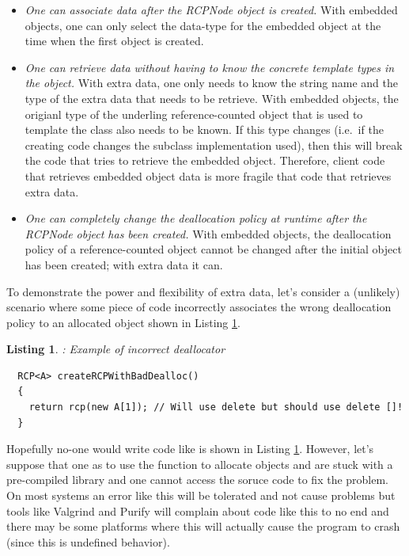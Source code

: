 \documentclass[pdf,ps2pdf,11pt]{SANDreport}
\newtheorem{listing}{Listing}
\begin{document}
\begin{itemize}

{}\item\textit{One can associate data after the RCPNode object is
created.}  With embedded objects, one can only select the data-type
for the embedded object at the time when the first {} object
is created.

{}\item\textit{One can retrieve data without having to know the
concrete template types in the {} object.}  With
extra data, one only needs to know the string name and the type of the
extra data that needs to be retrieve.  With embedded objects, the
origianl type of the underling reference-counted object that is used
to template the {} class also needs to be known.  If
this type changes (i.e.\ if the creating code changes the subclass
implementation used), then this will break the code that tries to
retrieve the embedded object.  Therefore, client code that retrieves
embedded object data is more fragile that code that retrieves extra
data.

{}\item\textit{One can completely change the deallocation policy at
runtime after the RCPNode object has been created.}  With embedded
objects, the deallocation policy of a reference-counted object cannot
be changed after the initial {} object has been
created; with extra data it can.

\end{itemize}

To demonstrate the power and flexibility of extra data, let's consider
a (unlikely) scenario where some piece of code incorrectly associates
the wrong deallocation policy to an allocated object shown in Listing
{}\ref{listing:createRCPWithBadDealloc}.

\begin{listing}: Example of incorrect deallocator \\
\label{listing:createRCPWithBadDealloc}
{\small\begin{verbatim}
  RCP<A> createRCPWithBadDealloc()
  {
    return rcp(new A[1]); // Will use delete but should use delete []!
  }
\end{verbatim}}
\end{listing}

Hopefully no-one would write code like is shown in Listing
{}\ref{listing:createRCPWithBadDealloc}.  However, let's suppose that
one as to use the function {} to
allocate {} objects and are stuck with a pre-compiled library
and one cannot access the soruce code to fix the problem.  On most
systems an error like this will be tolerated and not cause problems
but tools like Valgrind and Purify will complain about code like this
to no end and there may be some platforms where this will actually
cause the program to crash (since this is undefined behavior).
\end{document}
